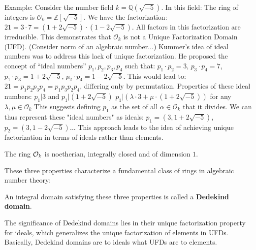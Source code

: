 \begin{outline}
    \1 Example: Consider the number field $k = \mathbb{Q}(\sqrt{-5})$. In this field:
        \2 The ring of integers is $\mathcal{O}_k = \mathbb{Z}[\sqrt{-5}]$.
        \2 We have the factorization: $21 = 3 \cdot 7 = (1+2\sqrt{-5}) \cdot (1-2\sqrt{-5})$. All factors in this factorization are irreducible. This demonstrates that $\mathcal{O}_k$ is not a Unique Factorization Domain (UFD). (Consider norm of an algebraic number$\ldots$)
        \2 Kummer's idea of ideal numbers was to address this lack of unique factorization. He proposed the concept of \enquote{ideal numbers} $p_1, p_2, p_3, p_4$ such that:
            $p_1 \cdot p_2 = 3$,
            $p_3 \cdot p_4 = 7$,
            $p_1 \cdot p_3 = 1 + 2\sqrt{-5}$,
            $p_2 \cdot p_4 = 1 - 2\sqrt{-5}$.
        This would lead to: $21 = p_1p_2p_3p_4 = p_1p_3p_2p_4$, differing only by permutation.
        \2 Properties of these ideal numbers:
            \3 $p_1 | 3$ and $p_1 | (1+2\sqrt{-5})$
            \3 $p_1 | (\lambda \cdot 3 + \mu \cdot (1+2\sqrt{-5}))$ for any $\lambda, \mu \in \mathcal{O}_k$
        \2 This suggests defining $p_1$ as the set of all $\alpha \in \mathcal{O}_k$ that it divides.
        We can thus represent these "ideal numbers" as ideals:
            $p_1 = (3, 1+2\sqrt{-5})$,
            $p_2 = (3, 1-2\sqrt{-5})\ldots$
    \1[] This approach leads to the idea of achieving unique factorization in terms of ideals rather than elements.
\0 \begin{theorem}
    The ring $\mathcal{O}_k$ is noetherian, integrally closed and of dimension $1$.
\end{theorem}

These three properties characterize a fundamental class of rings in algebraic number theory:

\begin{definition}
An integral domain satisfying these three properties is called a \textbf{Dedekind domain}. 
\end{definition}
\end{outline}

The significance of Dedekind domains lies in their unique factorization property for ideals, which generalizes the unique factorization of elements in UFDs. Basically, Dedekind domains are to ideals what UFDs are to elements.


